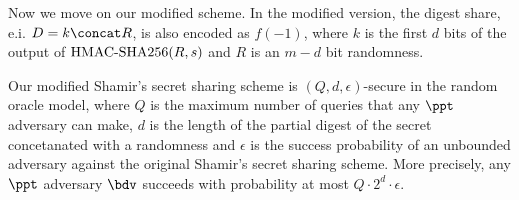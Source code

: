 \documentclass[envcountsame,runningheads,notitlepage]{llncs}
\begin{document}
	Now we move on our modified scheme. 	
	In the modified version, the digest share, e.i. $D = k \concat R$, is also encoded as $f(-1)$, where  $k$ is the first $d$ bits of the output of ${\textrm{HMAC-SHA256}}(R, s)$ and $R$ is an $m - d$ bit randomness. 
	
	\begin{theorem}
		Our modified Shamir's secret sharing scheme is $(Q, d, \epsilon)$-secure in  the random oracle model, where $Q$ is the maximum number of queries that any $\ppt$ adversary can make, $d$ is the length of the partial digest of the secret concetanated with a randomness and $\epsilon$ is the success probability of an unbounded adversary against the original Shamir's secret sharing scheme. 
		More precisely, any $\ppt$ adversary $\bdv$ succeeds with probability at most $Q \cdot 2^{d} \cdot \epsilon$.   
	\end{theorem}
	
\end{document}
